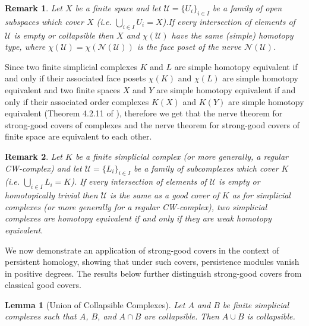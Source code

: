 \documentclass[12pt,a4paper,twoside, reqno, tbtags]{article}
\numberwithin{equation}{section}
\newtheorem{lemma}{Lemma}[section]
\newtheorem{remark}{Remark}[section]
\begin{document}
\begin{remark}\label{17}
     Let $X$ be a finite space and let $\mathcal{U} =\{U_i \}_{i\in I}$ be a family of open subspaces which cover $X$ (i.e. $\bigcup_{i\in I} U_i = X$).If every intersection of elements of $\mathcal{U}$ is empty or collapsible then $X$ and $\chi(\mathcal{U})$ have the same (simple) homotopy type, where $\chi(\mathcal{U})= \chi(\mathcal{N}(\mathcal{U}))$ is the face poset of the nerve $\mathcal{N}(\mathcal{U})$.
\end{remark}
    \noindent Since two finite simplicial complexes $K$ and $L$ are simple homotopy equivalent if and only if their associated face posets $\chi(K)$ and $\chi(L)$ are simple homotopy equivalent and two finite spaces $X$ and $Y$ are simple homotopy equivalent if and only if their associated order complexes $K(X)$ and $K(Y)$ are simple homotopy equivalent (Theorem 4.2.11 of \cite{Barmak}), therefore we get that the nerve theorem for strong-good covers of complexes and the nerve theorem for strong-good covers of finite space are equivalent to each other.
\begin{remark}\label{19}
    Let $K$ be a finite simplicial complex (or more generally, a regular CW-complex) and let $\mathcal{U} =\{L_i \}_{i\in I}$ be a family of subcomplexes which cover $K$ (i.e. $\bigcup_{i\in I} L_i = K$). If every intersection of elements of $\mathcal{U}$ is empty or homotopically trivial then $\mathcal{U}$ is the same as a good cover of $K$ as for simplicial complexes (or more generally for a regular CW-complex), two simplicial complexes are homotopy equivalent if and only if they are weak homotopy equivalent.
\end{remark}

    \noindent We now demonstrate an application of strong-good covers in the context of persistent homology, showing that under such covers, persistence modules vanish in positive degrees. The results below further distinguish strong-good covers from classical good covers.
    
\begin{lemma}[Union of Collapsible Complexes]
\label{lem:union-collapsible}
Let \( A \) and \( B \) be finite simplicial complexes such that \( A \), \( B \), and \( A \cap B \) are collapsible. Then \( A \cup B \) is collapsible.
\end{lemma}
\end{document}
